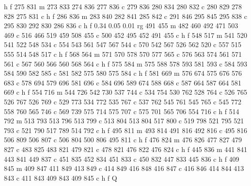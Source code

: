 {{        h f
        275 831 m
        273 833 274 836 277 836 c
        279 836 280 834 280 832 c
        280 829 278 828 275 831 c
        h f
        286 836 m
        283 840 282 841 285 842 c
        291 846 295 845 295 838 c
        295 830 292 830 286 836 c
        h f
        0.34 0.05 0.01 rg
        491 455 m
        482 460 492 471 503 469 c
        516 466 519 459 508 455 c
        500 452 495 452 491 455 c
        h f
        548 517 m
        541 520 541 522 548 534 c
        554 543 561 547 567 544 c
        570 542 567 526 562 520 c
        557 515 555 514 548 517 c
        h f
        568 564 m
        571 570 578 570 577 565 c
        576 563 574 561 571 561 c
        567 560 566 560 568 564 c
        h f
        575 584 m
        575 588 578 593 581 593 c
        584 593 584 590 582 585 c
        581 582 575 580 575 584 c
        h f
        581 669 m
        576 674 575 676 576 683 c
        578 694 579 696 581 696 c
        584 696 589 674 588 668 c
        587 664 587 664 581 669 c
        h f
        554 716 m
        544 726 542 730 537 744 c
        534 754 530 762 528 764 c
        526 765 526 767 526 769 c
        529 773 534 772 535 767 c
        537 762 545 761 545 765 c
        545 772 558 760 565 746 c
        569 739 575 714 575 707 c
        575 701 565 706 554 716 c
        h f
        514 792 m
        513 793 513 796 513 799 c
        513 804 513 804 517 800 c
        519 798 521 795 521 793 c
        521 790 517 789 514 792 c
        h f
        495 811 m
        493 814 491 816 492 816 c
        495 816 506 809 506 807 c
        506 804 500 806 495 811 c
        h f
        476 824 m
        476 826 477 827 479 827 c
        483 825 483 821 479 821 c
        478 821 476 822 476 824 c
        h f
        445 836 m
        441 841 443 841 449 837 c
        451 835 452 834 451 833 c
        450 832 447 833 445 836 c
        h f
        409 845 m
        409 847 411 849 413 849 c
        414 849 416 848 416 847 c
        416 846 414 844 413 843 c
        411 843 409 843 409 845 c
        h f
        Q
    }}

